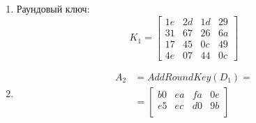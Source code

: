 \documentclass[a4paper, 14pt]{extarticle}
\begin{document}
\begin{enumerate}
\begin{enumerate}
\begin{equation}
\begin{split}
\begin{bmatrix}
                \end{bmatrix} , \begin{bmatrix}
                    10 \\ f0 \\ 63 \\ a2
                \end{bmatrix}, \begin{bmatrix}
                    aa \\ 7d \\ 59 \\ 6b
                \end{bmatrix} , \begin{bmatrix}
                    3c \\ 2b \\ 7d \\ 76
                \end{bmatrix} \right) = \\
                    &= \begin{bmatrix}
                        b0 & ea & fa & 0e \\
                        e5 & ec & d0 & 9b \\
                        bd & db & d8 & 77 \\
                        f1 & fc & 17 & fe
                    \end{bmatrix}
            \end{split}
        \end{equation}
        \item Раундовый ключ:
        \begin{equation}
            K_1 = \begin{bmatrix}
                1e & 2d & 1d & 29 \\
                31 & 67 & 26 & 6a \\
                17 & 45 & 0c & 49 \\
                4e & 07 & 44 & 0c
            \end{bmatrix}
        \end{equation}
        \item \begin{equation}
            \begin{split}
                A_2 &= AddRoundKey(D_1) = \\ &= \begin{bmatrix}
                        b0 & ea & fa & 0e \\
                        e5 & ec & d0 & 9b \\

\end{bmatrix}
\end{split}
\end{equation}
\end{enumerate}
\end{enumerate}
\end{document}
